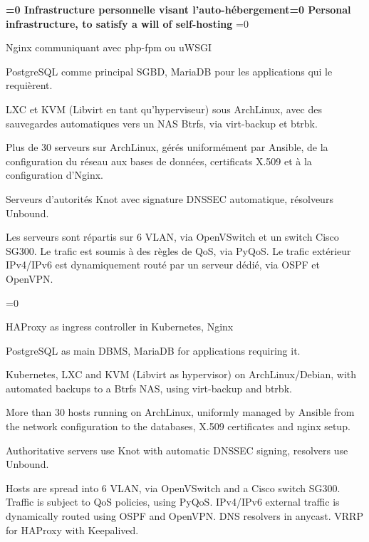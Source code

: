 \documentclass[11pt,a4paper,sans]{moderncv}
\newcommand{\babelFR}[1]{\ifnum\pdfstrcmp{\languagename}{french}=0 {#1}\fi}
\newcommand{\babelEN}[1]{\ifnum\pdfstrcmp{\languagename}{english}=0 {#1}\fi}
\begin{document}
{\textbf{\babelFR{Infrastructure personnelle visant l'auto-hébergement}\babelEN{Personal infrastructure, to satisfy a will of self-hosting}}%
\babelFR{
    \begin{description}[nolistsep]
        \item[Web:] Nginx communiquant avec php-fpm ou uWSGI
        \item[SGBD:] PostgreSQL comme principal SGBD, MariaDB pour
            les applications qui le requièrent.
        \item[Hyperviseur:] LXC et KVM (Libvirt en tant qu'hyperviseur) sous
            ArchLinux, avec des sauvegardes automatiques vers un NAS Btrfs, via
            virt-backup et btrbk.
        \item [Orchestration:] Plus de 30 serveurs sur ArchLinux, gérés
            uniformément par Ansible, de la configuration du réseau aux bases
            de données, certificats X.509 et à la configuration d'Nginx.
        \item[DNS:] Serveurs d'autorités Knot avec signature DNSSEC
            automatique, résolveurs Unbound.
        \item [Réseau:] Les serveurs sont répartis sur 6 VLAN, via OpenVSwitch
            et un switch Cisco SG300. Le trafic est soumis à des règles de QoS,
            via PyQoS. Le trafic extérieur IPv4/IPv6 est dynamiquement routé
            par un serveur dédié, via OSPF et OpenVPN.
    \end{description}
}%
\babelEN{%
    \begin{description}[nolistsep]
        \item[Web:] HAProxy as ingress controller in Kubernetes, Nginx
        \item[Databases:] PostgreSQL as main DBMS, MariaDB for applications
            requiring it.
        \item[Hypervisor:] Kubernetes, LXC and KVM (Libvirt as hypervisor) on
            ArchLinux/Debian, with automated backups to a Btrfs NAS, using
            virt-backup and btrbk.
        \item [Management:] More than 30 hosts running on ArchLinux, uniformly
            managed by Ansible from the network configuration to the databases,
            X.509 certificates and nginx setup.
        \item[DNS:] Authoritative servers use Knot with automatic DNSSEC
            signing, resolvers use Unbound.
        \item [Network:] Hosts are spread into 6 VLAN, via OpenVSwitch and a
            Cisco switch SG300. Traffic is subject to QoS policies, using
            PyQoS. IPv4/IPv6 external traffic is dynamically routed using OSPF
            and OpenVPN. DNS resolvers in anycast. VRRP for HAProxy with
            Keepalived.
    \end{description}
}}
\vspace{-1em}
\end{document}

